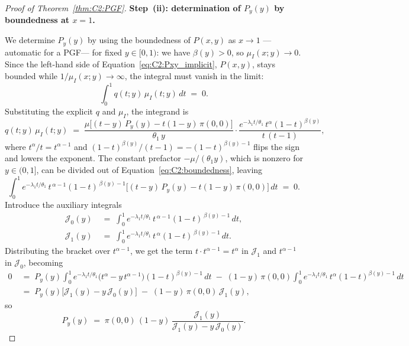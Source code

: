 \begin{proof}[Proof of Theorem~\ref{thm:C2:PGF}]
\medskip\noindent\textbf{Step~(ii): determination of $P_y(y)$ by boundedness at $x=1$.}

We determine $P_y(y)$ by using the boundedness of $P(x,y)$ as $x\to 1$ ---automatic for a PGF--- for fixed $y\in[0,1)$: we have $\beta(y)>0$, so $\mu_I(x;y)\to0$. Since the left-hand side of Equation~\eqref{eq:C2:Pxy_implicit}, $P(x,y)$, stays bounded while $1/\mu_I(x;y)\to\infty$, the integral must vanish in the limit:
\begin{equation}
    \int_0^1 q(t;y)\,\mu_I(t;y)\,dt \;=\; 0.
    \label{eq:C2:boundedness}
\end{equation}
Substituting the explicit $q$ and $\mu_I$, the integrand is
\begin{equation*}
    q(t;y)\,\mu_I(t;y)
    \;=\; \frac{\mu\bigl[(t-y)\,P_y(y) - t(1-y)\,\pi(0,0)\bigr]}{\theta_1\,y}
    \cdot \frac{e^{-\lambda_1 t/\theta_1}\,t^{\alpha}(1-t)^{\beta(y)}}{t\,(t-1)},
\end{equation*}
where $t^{\alpha}/t=t^{\alpha-1}$ and $(1-t)^{\beta(y)}/(t-1)=-(1-t)^{\beta(y)-1}$ flips the sign and lowers the exponent. The constant prefactor $-\mu/(\theta_1 y)$, which is nonzero for $y\in(0,1]$, can be divided out of Equation~\eqref{eq:C2:boundedness}, leaving
\begin{equation*}
    \int_0^1 e^{-\lambda_1 t/\theta_1}\,t^{\,\alpha-1}(1-t)^{\,\beta(y)-1}\bigl[(t-y)\,P_y(y) - t(1-y)\,\pi(0,0)\bigr]\,dt \;=\; 0.
\end{equation*}
Introduce the auxiliary integrals
\begin{align*}
    \mathcal{J}_0(y) &\;=\; \int_0^1 e^{-\lambda_1 t/\theta_1}\,t^{\,\alpha-1}(1-t)^{\,\beta(y)-1}\,dt, \\
    \mathcal{J}_1(y) &\;=\; \int_0^1 e^{-\lambda_1 t/\theta_1}\,t^{\,\alpha}(1-t)^{\,\beta(y)-1}\,dt.
\end{align*}
Distributing the bracket over $t^{\alpha-1}$, we get the term $t\cdot t^{\alpha-1}=t^{\alpha}$ in $\mathcal{J}_1$ and $t^{\alpha-1}$ in $\mathcal{J}_0$, becoming
\begin{align*}
    0 \;&=\; P_y(y)\!\int_0^1\! e^{-\lambda_1 t/\theta_1}\bigl(t^{\alpha}-y\,t^{\alpha-1}\bigr)(1-t)^{\beta(y)-1}\,dt
    \;-\; (1-y)\,\pi(0,0)\!\int_0^1\! e^{-\lambda_1 t/\theta_1}\,t^{\alpha}(1-t)^{\beta(y)-1}\,dt \\
    \;&=\; P_y(y)\bigl[\mathcal{J}_1(y) - y\,\mathcal{J}_0(y)\bigr] \;-\; (1-y)\,\pi(0,0)\,\mathcal{J}_1(y),
\end{align*}
so
\begin{equation}
    P_y(y) \;=\; \pi(0,0)\,(1-y)\,\frac{\mathcal{J}_1(y)}{\mathcal{J}_1(y) - y\,\mathcal{J}_0(y)}.

\end{equation}
\end{proof}
